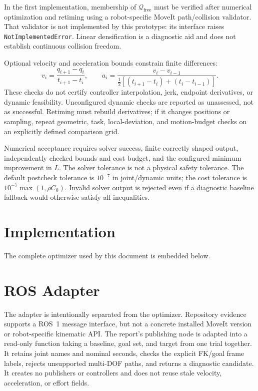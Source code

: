 \documentclass[11pt]{article}
\begin{document}
In the first implementation, membership of
$\mathcal Q_{\mathrm{free}}$ must be verified after numerical optimization
and retiming using a robot-specific MoveIt path/collision validator.
That validator is not implemented by this prototype: its interface raises
\texttt{NotImplementedError}. Linear densification is a diagnostic aid and
does not establish continuous collision freedom.

Optional velocity and acceleration bounds constrain finite differences:
\[
 v_i=\frac{q_{i+1}-q_i}{t_{i+1}-t_i},\qquad
 a_i=\frac{v_i-v_{i-1}}
 {\tfrac12[(t_{i+1}-t_i)+(t_i-t_{i-1})]}.
\]
These checks do not certify controller interpolation, jerk, endpoint
derivatives, or dynamic feasibility. Unconfigured dynamic checks are
reported as unassessed, not as successful. Retiming must rebuild derivatives;
if it changes positions or sampling, repeat geometric, task, local-deviation,
and motion-budget checks on an explicitly defined comparison grid.

Numerical acceptance requires solver success, finite correctly shaped
output, independently checked bounds and cost budget, and the configured
minimum improvement in $L$. The solver tolerance is not a physical safety
tolerance. The default postcheck tolerance is $10^{-7}$ in joint/dynamic
units; the cost tolerance is $10^{-7}\max(1,\rho C_0)$.
Invalid solver output is rejected even if a diagnostic baseline fallback
would otherwise satisfy all inequalities.

\section{Implementation}

The complete optimizer used by this document is embedded below.



\section{ROS Adapter}

The adapter is intentionally separated from the optimizer. Repository
evidence supports a ROS~1 message interface, but not a concrete installed
MoveIt version or robot-specific kinematic API. The report's publishing node
is adapted into a read-only function taking a baseline, goal set, and target
from one trial together. It retains joint names and nominal seconds, checks
the explicit FK/goal frame labels, rejects unsupported multi-DOF paths, and
returns a diagnostic candidate. It creates no publishers or controllers and
does not reuse stale velocity, acceleration, or effort fields.
\end{document}
